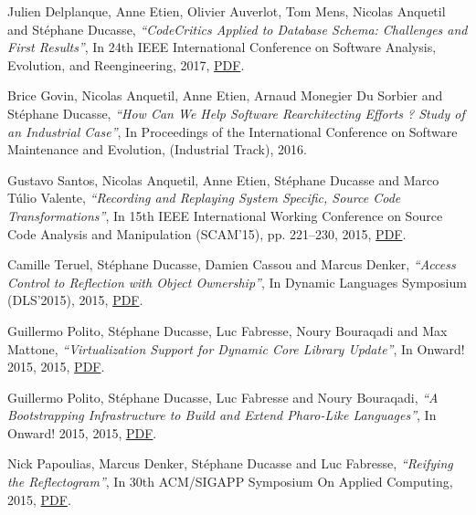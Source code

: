 \documentclass{article}
\newcommand{\czauthors}[1]{#1}
\newcommand{\cztitle}[1]{\emph{``#1''}}
\newcommand{\czbooktitle}[1]{#1}
\begin{document}
\begin{itemize}
	\pub  \czauthors{Julien Delplanque, Anne Etien, Olivier Auverlot, Tom Mens, Nicolas Anquetil and St\'ephane Ducasse},  \cztitle{CodeCritics Applied to Database Schema: Challenges and First Results},  In \czbooktitle{24th IEEE International Conference on Software Analysis, Evolution, and Reengineering}, 2017, \href{http://rmod-files.lille.inria.fr/Team/Texts/Papers/Delp17a-Saner-CodeCritics-Applied-To-Database-Schemas.pdf}{PDF}.

	\pub  \czauthors{Brice Govin, Nicolas Anquetil, Anne Etien, Arnaud Monegier Du Sorbier and St\'ephane Ducasse},  \cztitle{{How Can We Help Software Rearchitecting Efforts ? Study of an Industrial Case}},  In \czbooktitle{{Proceedings of the International Conference on Software Maintenance and Evolution, (Industrial Track)}}, 2016.

	\pub  \czauthors{Gustavo Santos, Nicolas Anquetil, Anne Etien, St\'ephane Ducasse and Marco T\'ulio Valente},  \cztitle{Recording and Replaying System Specific, Source Code Transformations},  In \czbooktitle{15th IEEE International Working Conference on Source Code Analysis and Manipulation (SCAM'15)}, pp. 221--230, 2015, \href{http://rmod-files.lille.inria.fr/Team/Texts/Papers/Sant15b-SCAM-MacroRecorder.pdf}{PDF}.

	\pub  \czauthors{Camille Teruel, St\'ephane Ducasse, Damien Cassou and Marcus Denker},  \cztitle{Access Control to Reflection with Object Ownership},  In \czbooktitle{Dynamic Languages Symposium (DLS'2015)}, 2015, \href{http://rmod-files.lille.inria.fr/Team/Texts/Papers/Teru15b-DLS15-AccessControlWithOwnership.pdf}{PDF}.

	\pub  \czauthors{Guillermo Polito, St\'ephane Ducasse, Luc Fabresse, Noury Bouraqadi and Max Mattone},  \cztitle{Virtualization Support for Dynamic Core Library Update},  In \czbooktitle{Onward! 2015}, 2015, \href{http://rmod-files.lille.inria.fr/Team/Texts/Papers/Poli15b-Onward-CoreLibrariesHotUpdate.pdf}{PDF}.

	\pub  \czauthors{Guillermo Polito, St\'ephane Ducasse, Luc Fabresse and Noury Bouraqadi},  \cztitle{A Bootstrapping Infrastructure to Build and Extend Pharo-Like Languages},  In \czbooktitle{Onward! 2015}, 2015, \href{http://rmod-files.lille.inria.fr/Team/Texts/Papers/Poli15a-Onward-Bootstrapping.pdf}{PDF}.

	\pub  \czauthors{Nick Papoulias, Marcus Denker, St\'ephane Ducasse and Luc Fabresse},  \cztitle{Reifying the Reflectogram},  In \czbooktitle{{30th ACM/SIGAPP Symposium On Applied Computing}}, 2015, \href{http://rmod-files.lille.inria.fr/Team/Texts/Papers/Papo15a-ACM-SAC-Reflectogram.pdf}{PDF}.


\end{itemize}
\end{document}
